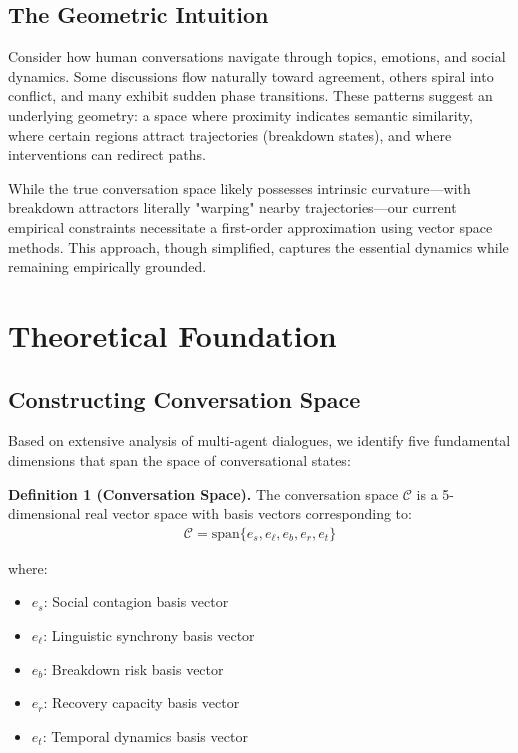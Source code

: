 \documentclass[11pt,letterpaper]{article}
\begin{document}
\subsection{The Geometric Intuition}

Consider how human conversations navigate through topics, emotions, and social dynamics. Some discussions flow naturally toward agreement, others spiral into conflict, and many exhibit sudden phase transitions. These patterns suggest an underlying geometry: a space where proximity indicates semantic similarity, where certain regions attract trajectories (breakdown states), and where interventions can redirect paths.

While the true conversation space likely possesses intrinsic curvature—with breakdown attractors literally "warping" nearby trajectories—our current empirical constraints necessitate a first-order approximation using vector space methods. This approach, though simplified, captures the essential dynamics while remaining empirically grounded.

\section{Theoretical Foundation}

\subsection{Constructing Conversation Space}

Based on extensive analysis of multi-agent dialogues, we identify five fundamental dimensions that span the space of conversational states:

\textbf{Definition 1 (Conversation Space).} The conversation space $\mathcal{C}$ is a 5-dimensional real vector space with basis vectors corresponding to:
\begin{align}
\mathcal{C} = \text{span}\{e_s, e_\ell, e_b, e_r, e_t\}
\end{align}

where:
\begin{itemize}
    \item $e_s$: Social contagion basis vector
    \item $e_\ell$: Linguistic synchrony basis vector
    \item $e_b$: Breakdown risk basis vector
    \item $e_r$: Recovery capacity basis vector
    \item $e_t$: Temporal dynamics basis vector
\end{itemize}
\end{document}
